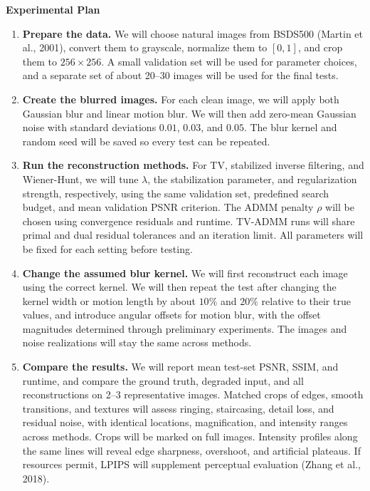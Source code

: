\documentclass[10pt,letterpaper]{article}
\newcommand{\sectiontitle}[1]{%
  \vspace{2pt}\textcolor{accent}{\fontsize{10.8}{12.2}\selectfont\bfseries #1}\par\vspace{-1pt}%
}
\begin{document}
\sectiontitle{Experimental Plan}
\begin{enumerate}[leftmargin=4.3em,label=\textbf{Step \arabic*:},labelsep=0.45em,itemsep=1pt,topsep=1pt,parsep=0pt]
  \item \textbf{Prepare the data.} We will choose natural images from BSDS500 (Martin et al., 2001), convert them to grayscale, normalize them to $[0,1]$, and crop them to $256\times256$. A small validation set will be used for parameter choices, and a separate set of about 20--30 images will be used for the final tests.

  \item \textbf{Create the blurred images.} For each clean image, we will apply both Gaussian blur and linear motion blur. We will then add zero-mean Gaussian noise with standard deviations $0.01$, $0.03$, and $0.05$. The blur kernel and random seed will be saved so every test can be repeated.

  \item \textbf{Run the reconstruction methods.} For TV, stabilized inverse filtering, and Wiener-Hunt, we will tune $\lambda$, the stabilization parameter, and regularization strength, respectively, using the same validation set, predefined search budget, and mean validation PSNR criterion. The ADMM penalty $\rho$ will be chosen using convergence residuals and runtime. TV-ADMM runs will share primal and dual residual tolerances and an iteration limit. All parameters will be fixed for each setting before testing.

  \item \textbf{Change the assumed blur kernel.} We will first reconstruct each image using the correct kernel. We will then repeat the test after changing the kernel width or motion length by about $10\%$ and $20\%$ relative to their true values, and introduce angular offsets for motion blur, with the offset magnitudes determined through preliminary experiments. The images and noise realizations will stay the same across methods.

  \item \textbf{Compare the results.} We will report mean test-set PSNR, SSIM, and runtime, and compare the ground truth, degraded input, and all reconstructions on 2--3 representative images. Matched crops of edges, smooth transitions, and textures will assess ringing, staircasing, detail loss, and residual noise, with identical locations, magnification, and intensity ranges across methods. Crops will be marked on full images. Intensity profiles along the same lines will reveal edge sharpness, overshoot, and artificial plateaus. If resources permit, LPIPS will supplement perceptual evaluation (Zhang et al., 2018).
\end{enumerate}
\end{document}

